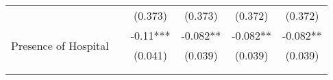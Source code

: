 \begin{table}[H]
\begin{footnotesize}
\begin{center}
{\begin{threeparttable}[b]
\begin{tabular}{rrcccr}
          &       & (0.373) & (0.373) & (0.372) & \multicolumn{1}{c}{ (0.372) } \\
    \multicolumn{1}{l}{\multirow{2}[0]{*}{Presence of Hospital}} &       & -0.11*** & -0.082** & -0.082** & \multicolumn{1}{c}{ -0.082** } \\
          &       & (0.041) & (0.039) & (0.039) & \multicolumn{1}{c}{ (0.039) } \\
          &       &       &       &       &  \\
    \midrule
    \midrule
          &       &       &       &       &  \\
    \end{tabular}%
    
    
  \label{table:infra}%

\end{threeparttable}
}
\end{center}
\end{footnotesize}
\end{table}